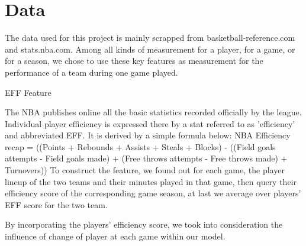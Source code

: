 \section{Data}

The data used for this project is mainly scrapped from basketball-reference.com
and stats.nba.com. Among all kinds of measurement for a player, for a game, or
for a season, we chose to use these key features as measurement for the performance
of a team during one game played.


EFF Feature

The NBA publishes online all the basic statistics recorded officially by the 
league. Individual player efficiency is expressed there by a stat referred to
as 'efficiency' and abbreviated EFF. It is derived by a simple formula below:
NBA Efficiency recap = ((Points + Rebounds + Assists + Steals + Blocks) - ((Field goals attempts - Field goals made) + (Free throws attempts - Free throws made) + Turnovers))
To construct the feature, we found out for each game, the player lineup of the
two teams and their minutes played in that game, then query their efficiency
score of the corresponding game season, at last we average over players’ EFF
score for the two team. 

By incorporating the players’ efficiency score, we took into consideration the
influence of change of player at each game within our model. 



